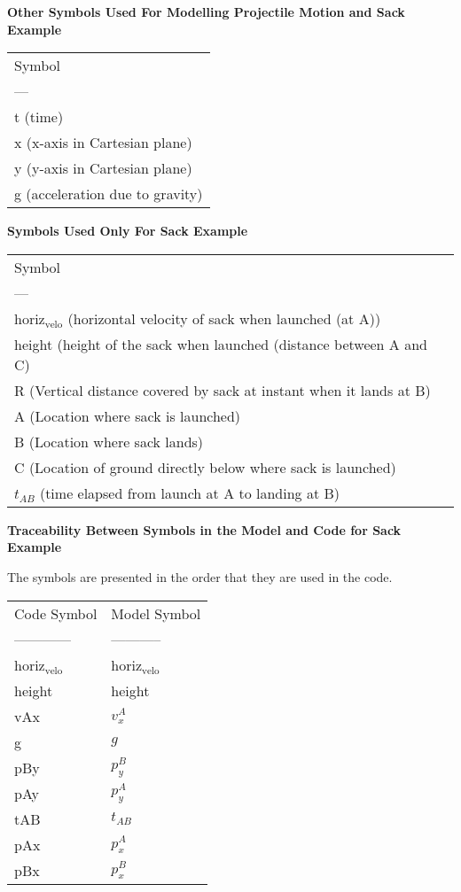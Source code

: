 \documentclass[11pt]{article}
\begin{document}
\textbf{Other Symbols Used For Modelling Projectile Motion and Sack Example}

\begin{center}
\begin{tabular}{l}
Symbol\\
---\\
t (time)\\
x (x-axis in Cartesian plane)\\
y (y-axis in Cartesian plane)\\
g (acceleration due to gravity)\\
\end{tabular}
\end{center}

\textbf{Symbols Used Only For Sack Example}

\begin{center}
\begin{tabular}{l}
Symbol\\
---\\
horiz$_{\text{velo}}$ (horizontal velocity of sack when launched (at A))\\
height (height of the sack when launched (distance between A and C)\\
R (Vertical distance covered by sack at instant when it lands at B)\\
A (Location where sack is launched)\\
B (Location where sack lands)\\
C (Location of ground directly below where sack is launched)\\
$t_{AB}$ (time elapsed from launch at A to landing at B)\\
\end{tabular}
\end{center}

\textbf{Traceability Between Symbols in the Model and Code for Sack Example}

The symbols are presented in the order that they are used in the code.

\begin{center}
\begin{tabular}{ll}
Code Symbol & Model Symbol\\
------------ & -----------\\
horiz$_{\text{velo}}$ & horiz$_{\text{velo}}$\\
height & height\\
vAx & $v^A_x$\\
g & $g$\\
pBy & $p^B_y$\\
pAy & $p^A_y$\\
tAB & $t_{AB}$\\
pAx & $p^A_x$\\
pBx & $p^B_x$\\
\end{tabular}
\end{center}
\end{document}
